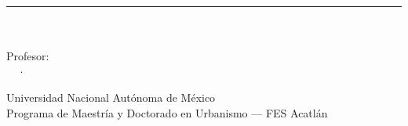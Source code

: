 
\begin{titlepage}
\thispagestyle{empty}
\setcounter{page}{0}
\centering

\vspace*{4cm}

{\huge\bfseries \TituloArticulo}

\vspace{0.5cm}
{\color{ColorPrincipal}\rule{0.45\textwidth}{0.8pt}}
\vspace{0.4cm}

{\large\itshape\color{ColorTexto} \SubtituloArticulo}

\vfill

{\normalsize\textbf{\Autor}}\\[0.4cm]
{\small \Materia}\\[0.15cm]
{\small Profesor:\ \ProfesorAsignado}\\[0.15cm]
{\small \Semestre\ \ ·\ \ \FechaEntrega}

\vspace{1.8cm}

{\footnotesize\color{ColorPrincipal}
  Universidad Nacional Autónoma de México\\
  Programa de Maestría y Doctorado en Urbanismo — FES Acatlán%
}

\vspace{1cm}

\end{titlepage}
